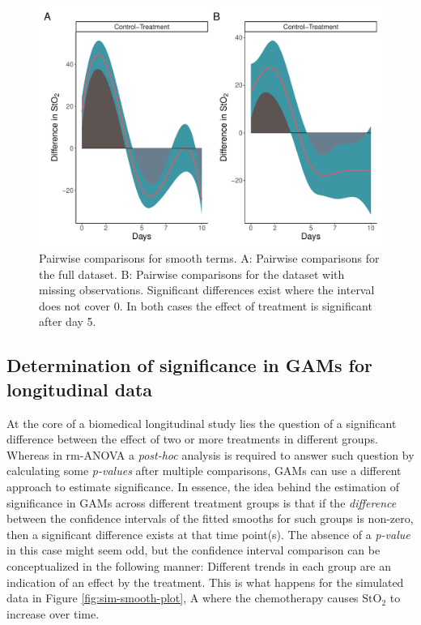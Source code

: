 \documentclass[
]{article}
\begin{document}
\begin{figure}[H]

{\centering \includegraphics[width=0.75\linewidth,]{Full_document_files/figure-latex/plot-pairwise-comp-1} 

}

\caption{Pairwise comparisons for smooth terms. A: Pairwise comparisons for the full dataset. B: Pairwise comparisons for the dataset with missing observations. Significant differences exist where the interval does not cover 0. In both cases the effect of treatment is significant after day 5.}\label{fig:plot-pairwise-comp}
\end{figure}

\hypertarget{determination-of-significance-in-gams-for-longitudinal-data}{%
\subsection{Determination of significance in GAMs for longitudinal data}\label{determination-of-significance-in-gams-for-longitudinal-data}}

At the core of a biomedical longitudinal study lies the question of a significant difference between the effect of two or more treatments in different groups. Whereas in rm-ANOVA a \emph{post-hoc} analysis is required to answer such question by calculating some \emph{p-values} after multiple comparisons, GAMs can use a different approach to estimate significance. In essence, the idea behind the estimation of significance in GAMs across different treatment groups is that if the \emph{difference} between the confidence intervals of the fitted smooths for such groups is non-zero, then a significant difference exists at that time point(s). The absence of a \emph{p-value} in this case might seem odd, but the confidence interval comparison can be conceptualized in the following manner: Different trends in each group are an indication of an effect by the treatment. This is what happens for the simulated data in Figure \ref{fig:sim-smooth-plot}, A where the chemotherapy causes \(\mbox{StO}_2\) to increase over time.
\end{document}
